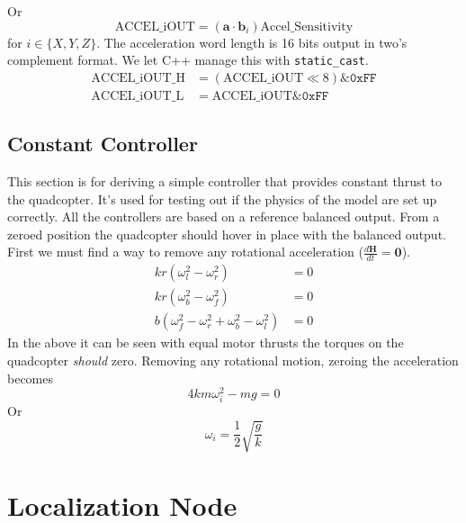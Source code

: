 \documentclass[lettersize,journal]{IEEEtran}
\newcommand*\BitAnd{\mathbin{\&}}
\newcommand*\ShiftLeft{\ll}
\begin{document}
Or
\begin{equation}
  \mathrm{ACCEL\_iOUT} = (\mathbf{a}\cdot\mathbf{b}_i) \mathrm{Accel\_Sensitivity}
\end{equation}
for $i\in \{X, Y, Z\}$. The acceleration word length is 16 bits output in two's complement format. We let C++ manage this with \texttt{static\_cast}.
\begin{align}
  \mathrm{ACCEL\_iOUT\_H} &= (\mathrm{ACCEL\_iOUT} \ShiftLeft 8) \BitAnd
  \mathtt{0xFF} \\
  \mathrm{ACCEL\_iOUT\_L} &= \mathrm{ACCEL\_iOUT} \BitAnd \mathtt{0xFF}
\end{align}

\subsection{Constant Controller}
This section is for deriving a simple controller that provides constant thrust to the quadcopter. It's used for testing out if the physics of the model are set up correctly. All the controllers are based on a reference balanced output. From a zeroed position the quadcopter should hover in place with the balanced output. First we must find a way to remove any rotational acceleration ($\frac{d\mathbf{H}}{dt} = \mathbf{0}$).
\begin{align}
  kr\left(\omega_l^2-\omega_r^2\right) &= 0 \nonumber \\
  kr\left(\omega_b^2-\omega_f^2\right) &= 0\nonumber \\
  b\left(\omega_f^2-\omega_r^2 + \omega_b^2 - \omega_l^2\right) &= 0 \nonumber
\end{align}
In the above it can be seen with equal motor thrusts the torques on the quadcopter \emph{should} zero. Removing any rotational motion, zeroing the acceleration becomes
\begin{equation}
  4km\omega_i^2 -mg = 0 \nonumber
\end{equation}
Or
\begin{equation}
  \omega_i = \frac{1}{2}\sqrt{\frac{g}{k}}
\end{equation}

\section{Localization Node}
\end{document}
